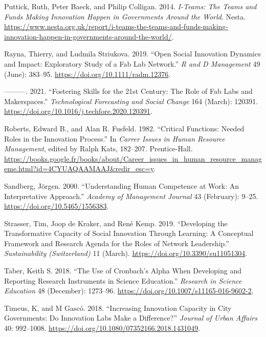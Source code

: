 \documentclass[AMA,STIX1COL,APA,STIX2COL]{WileyNJD-v2}
\newlength{\cslhangindent}
\newenvironment{CSLReferences}[2] %
 {%
  \setlength{\parindent}{0pt}
  \ifodd #1 \everypar{\setlength{\hangindent}{\cslhangindent}}\ignorespaces\fi
  \ifnum #2 > 0
  \setlength{\parskip}{#2\baselineskip}
  \fi
 }%
 {}
\begin{document}
\begin{CSLReferences}{1}{0}
\leavevmode{}%
Puttick, Ruth, Peter Baeck, and Philip Colligan. 2014. \emph{I-Teams:
The Teams and Funds Making Innovation Happen in Governments Around the
World}. Nesta.
\url{https://www.nesta.org.uk/report/i-teams-the-teams-and-funds-making-innovation-happen-in-governments-around-the-world/}.

\leavevmode{}%
Rayna, Thierry, and Ludmila Striukova. 2019. {``Open Social Innovation
Dynamics and Impact: Exploratory Study of a Fab Lab Network.''} \emph{R
and D Management} 49 (June): 383--95.
\url{https://doi.org/10.1111/radm.12376}.

\leavevmode{}%
---------. 2021. {``Fostering Skills for the 21st Century: The Role of
Fab Labs and Makerspaces.''} \emph{Technological Forecasting and Social
Change} 164 (March): 120391.
\url{https://doi.org/10.1016/j.techfore.2020.120391}.

\leavevmode{}%
Roberts, Edward B., and Alan R. Fusfeld. 1982. {``Critical Functions:
Needed Roles in the Innovation Process.''} In \emph{Carrer Issues in
Human Resource Management}, edited by Ralph Kats, 182--207.
Prentice-Hall.
\url{https://books.google.fr/books/about/Career_issues_in_human_resource_manageme.html?id=4CYUAQAAMAAJ\&redir_esc=y}.

\leavevmode{}%
Sandberg, Jörgen. 2000. {``Understanding Human Competence at Work: An
Interpretative Approach.''} \emph{Academy of Management Journal} 43
(February): 9--25. \url{https://doi.org/10.5465/1556383}.

\leavevmode{}%
Strasser, Tim, Joop de Kraker, and René Kemp. 2019. {``Developing the
Transformative Capacity of Social Innovation Through Learning: A
Conceptual Framework and Research Agenda for the Roles of Network
Leadership.''} \emph{Sustainability (Switzerland)} 11 (March).
\url{https://doi.org/10.3390/su11051304}.

\leavevmode{}%
Taber, Keith S. 2018. {``The Use of Cronbach's Alpha When Developing and
Reporting Research Instruments in Science Education.''} \emph{Research
in Science Education} 48 (December): 1273--96.
\url{https://doi.org/10.1007/s11165-016-9602-2}.

\leavevmode{}%
Timeus, K, and M Gascó. 2018. {``Increasing Innovation Capacity in City
Governments: Do Innovation Labs Make a Difference?''} \emph{Journal of
Urban Affairs} 40: 992--1008.
\url{https://doi.org/10.1080/07352166.2018.1431049}.


\end{CSLReferences}
\end{document}

